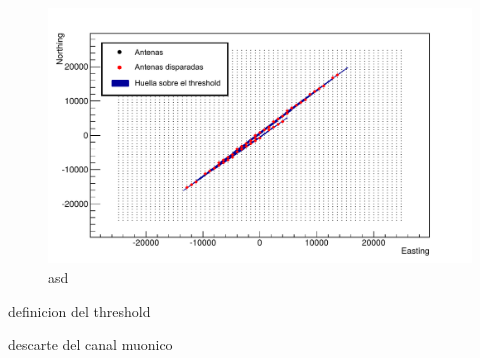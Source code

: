 	\begin{figure}[h!]
		\begin{center}
			\includegraphics[width=\textwidth]{fig/resultadosRadio/trigger}
			\caption{asd}
			\label{fig:}
		\end{center}
	\end{figure}
	
	definicion del threshold
	
	descarte del canal muonico
	
	
